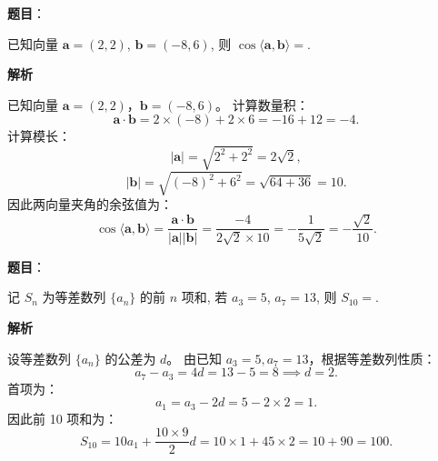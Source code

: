 \begin{answer}

\textbf{题目}：

已知向量 $\boldsymbol{a} = (2, 2)$, $\boldsymbol{b} = (-8, 6)$, 则 $\cos\langle\boldsymbol{a}, \boldsymbol{b}\rangle =$\gkblank{}.

\textbf{解析}

已知向量 $\boldsymbol{a} = (2, 2)$，$\boldsymbol{b} = (-8, 6)$。
计算数量积：
\nopagebreak[4]
\[\boldsymbol{a} \cdot \boldsymbol{b} = 2 \times (-8) + 2 \times 6 = -16 + 12 = -4.\]
计算模长：
\nopagebreak[4]
\[|\boldsymbol{a}| = \sqrt{2^2 + 2^2} = 2\sqrt{2},\]
\nopagebreak[4]
\[|\boldsymbol{b}| = \sqrt{(-8)^2 + 6^2} = \sqrt{64 + 36} = 10.\]
因此两向量夹角的余弦值为：
\nopagebreak[4]
\[\cos\langle\boldsymbol{a}, \boldsymbol{b}\rangle = \frac{\boldsymbol{a} \cdot \boldsymbol{b}}{|\boldsymbol{a}||\boldsymbol{b}|} = \frac{-4}{2\sqrt{2} \times 10} = -\frac{1}{5\sqrt{2}} = -\frac{\sqrt{2}}{10}.\]


\end{answer}
\begin{answer}

\textbf{题目}：

记 $S_n$ 为等差数列 $\{a_n\}$ 的前 $n$ 项和, 若 $a_3 = 5$, $a_7 = 13$, 则 $S_{10} =$\gkblank{}.

\textbf{解析}

设等差数列 $\{a_n\}$ 的公差为 $d$。
由已知 $a_3 = 5, a_7 = 13$，根据等差数列性质：
\nopagebreak[4]
\[a_7 - a_3 = 4d = 13 - 5 = 8 \implies d = 2.\]
首项为：
\nopagebreak[4]
\[a_1 = a_3 - 2d = 5 - 2 \times 2 = 1.\]
因此前 10 项和为：
\nopagebreak[4]
\[S_{10} = 10a_1 + \frac{10 \times 9}{2}d = 10 \times 1 + 45 \times 2 = 10 + 90 = 100.\]


\end{answer}
